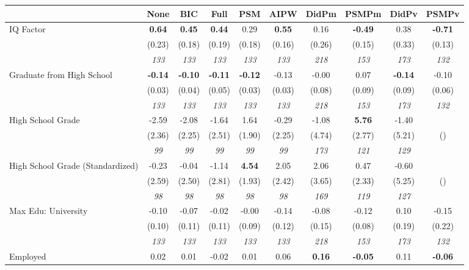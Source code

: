 \begin{tabular}{l c c c c c c c c c}
\toprule
 & None & BIC & Full & PSM & AIPW & DidPm & PSMPm & DidPv & PSMPv \\
\midrule
IQ Factor & \textbf{ 0.64 } & \textbf{ 0.45 } & \textbf{ 0.44 } & 0.29 & \textbf{0.55} & 0.16 & \textbf{-0.49} & 0.38 & \textbf{-0.71} \\
& (0.23) & (0.18) & (0.19) & (0.18) & (0.16) & (0.26) & (0.15) & (0.33) & (0.13) \\
& \textit{ 133 } & \textit{ 133 } & \textit{ 133 } & \textit{ 133 } & \textit{ 133 } & \textit{ 218 } & \textit{ 153 } & \textit{ 173 } & \textit{ 132 } \\
Graduate from High School & \textbf{ -0.14 } & \textbf{ -0.10 } & \textbf{ -0.11 } & \textbf{-0.12} & -0.13 & -0.00 & 0.07 & \textbf{ -0.14 } & -0.10 \\
& (0.03) & (0.04) & (0.05) & (0.03) & (0.03) & (0.08) & (0.09) & (0.09) & (0.06) \\
& \textit{ 133 } & \textit{ 133 } & \textit{ 133 } & \textit{ 133 } & \textit{ 133 } & \textit{ 218 } & \textit{ 153 } & \textit{ 173 } & \textit{ 132 } \\
High School Grade & -2.59 & -2.08 & -1.64 & 1.64 & -0.29 & -1.08 & \textbf{5.76} & -1.40 & \\
& (2.36) & (2.25) & (2.51) & (1.90) & (2.25) & (4.74) & (2.77) & (5.21) & () \\
& \textit{ 99 } & \textit{ 99 } & \textit{ 99 } & \textit{ 99 } & \textit{ 99 } & \textit{ 173 } & \textit{ 121 } & \textit{ 129 } & \\
High School Grade (Standardized) & -0.23 & -0.04 & -1.14 & \textbf{4.54} & 2.05 & 2.06 & 0.47 & -0.60 & \\
& (2.59) & (2.50) & (2.81) & (1.93) & (2.42) & (3.65) & (2.33) & (5.25) & () \\
& \textit{ 98 } & \textit{ 98 } & \textit{ 98 } & \textit{ 98 } & \textit{ 98 } & \textit{ 169 } & \textit{ 119 } & \textit{ 127 } & \\
Max Edu: University & -0.10 & -0.07 & -0.02 & -0.00 & -0.14 & -0.08 & -0.12 & 0.10 & -0.15 \\
& (0.10) & (0.11) & (0.11) & (0.09) & (0.12) & (0.15) & (0.08) & (0.19) & (0.22) \\
& \textit{ 133 } & \textit{ 133 } & \textit{ 133 } & \textit{ 133 } & \textit{ 133 } & \textit{ 218 } & \textit{ 153 } & \textit{ 173 } & \textit{ 132 } \\
Employed & 0.02 & 0.01 & -0.02 & 0.01 & 0.06 & \textbf{ 0.16 } & \textbf{-0.05} & 0.11 & \textbf{-0.06} \\

\end{tabular}
